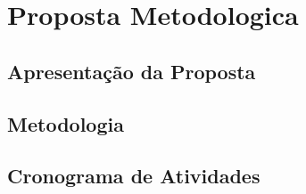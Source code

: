 

\markright{}            %
\pagestyle{headings}    %
\newpage                %

\chapter{Proposta Metodologica}
\label{cha:proposta-metodologica}

\section{Apresentação da Proposta}
\label{sec:apresentacao-proposta}

\section{Metodologia}
\label{sec:metodologia-proposta}

\section{Cronograma de Atividades}
\label{sec:cronograma-atividades}


